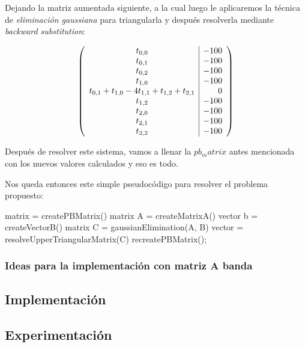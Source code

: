 Dejando la matriz aumentada siguiente, a la cual luego le aplicaremos la técnica de \textit{eliminación gaussiana} para triangularla y después resolverla mediante \textit{backward substitution}:

$$
\left( \begin{array}{c | r}
t_{0,0} & -100\\
t_{0,1} & -100\\
t_{0,2} & -100 \\
t_{1,0} & -100\\
t_{0,1} + t_{1,0} - 4t_{1,1} + t_{1,2} + t_{2,1} & 0\\
t_{1,2} & -100\\
t_{2,0} & -100\\
t_{2,1} & -100\\
t_{2,2} & -100\\
\end{array} \right)
$$

\vspace{\baselineskip}

Después de resolver este sistema, vamos a llenar la $pb_matrix$ antes mencionada con los nuevos valores calculados y eso es todo.
\par 
Nos queda entonces este simple pseudocódigo para resolver el problema propuesto:

\vspace{\baselineskip}
\begin{codebox}
\li matrix  = createPBMatrix()
\li matrix \id A = createMatrixA()
\li vector \id b = createVectorB()
\li matrix \id C = gaussianElimination(\id A, \id B)
\li vector  = resolveUpperTriangularMatrix(C)
\li recreatePBMatrix();
\End
\end{codebox} 
\vspace{\baselineskip}

\subsubsection{Ideas para la implementación con matriz A banda}

\subsection{Implementación}

\subsection{Experimentación}

